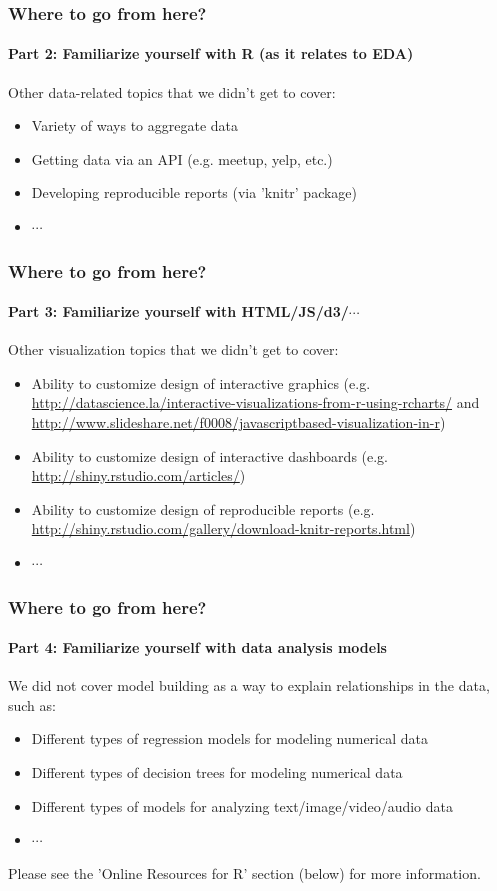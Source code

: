\begin{frame}
  \frametitle{Where to go from here?}
  \framesubtitle{Part 2: Familiarize yourself with R (as it relates to EDA)}

  Other data-related topics that we didn't get to cover:
  \begin{itemize}
    \item Variety of ways to aggregate data
    \item Getting data via an API (e.g. meetup, yelp, etc.)
    \item Developing reproducible reports (via 'knitr' package)    
    \item $\cdots$
  \end{itemize}
\end{frame}

\begin{frame}
  \frametitle{Where to go from here?}
  \framesubtitle{Part 3: Familiarize yourself with HTML/JS/d3/$\cdots$}

  Other visualization topics that we didn't get to cover:
  \begin{itemize}
    \item Ability to customize design of interactive graphics (e.g. \url{http://datascience.la/interactive-visualizations-from-r-using-rcharts/} and \url{http://www.slideshare.net/f0008/javascriptbased-visualization-in-r})
    \item Ability to customize design of interactive dashboards (e.g. \url{http://shiny.rstudio.com/articles/})
    \item Ability to customize design of reproducible reports   (e.g. \url{http://shiny.rstudio.com/gallery/download-knitr-reports.html}) 
    \item $\cdots$
  \end{itemize}
\end{frame}

\begin{frame}
  \frametitle{Where to go from here?}
  \framesubtitle{Part 4: Familiarize yourself with data analysis models}

  We did not cover model building as a way to explain relationships in the data, such as:
  \begin{itemize}
    \item Different types of regression models for modeling numerical data
    \item Different types of decision trees for modeling numerical data
    \item Different types of models for analyzing text/image/video/audio data   
    \item $\cdots$
  \end{itemize}
  Please see the 'Online Resources for R' section (below) for more information.
\end{frame}

